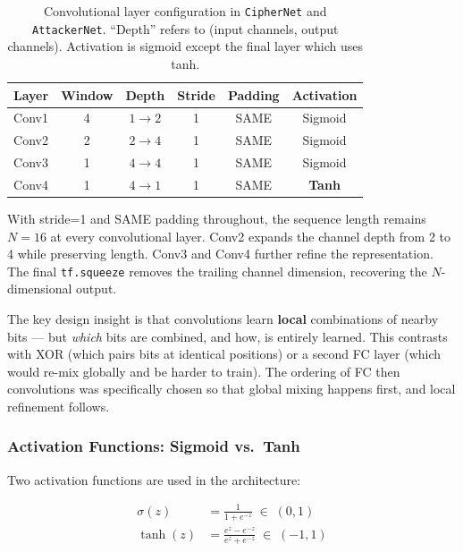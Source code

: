 \documentclass[12pt, a4paper]{article}
\newcommand{\code}[1]{\texttt{\color{CodeRed}#1}}
\begin{document}
\begin{table}[H]
  \centering
  \caption{Convolutional layer configuration in \code{CipherNet} and
           \code{AttackerNet}. ``Depth'' refers to (input channels,
           output channels). Activation is sigmoid except the final
           layer which uses tanh.}
  \label{tab:conv_layers}
  \begin{tabular}{@{} c c c c c c @{}}
    \toprule
    \textbf{Layer} & \textbf{Window} & \textbf{Depth} &
    \textbf{Stride} & \textbf{Padding} & \textbf{Activation} \\
    \midrule
    Conv1 & 4 & $1 \to 2$ & 1 & SAME & Sigmoid \\
    Conv2 & 2 & $2 \to 4$ & 1 & SAME & Sigmoid \\
    Conv3 & 1 & $4 \to 4$ & 1 & SAME & Sigmoid \\
    Conv4 & 1 & $4 \to 1$ & 1 & SAME & \textbf{Tanh} \\
    \bottomrule
  \end{tabular}
\end{table}

\noindent With stride=1 and SAME padding throughout, the sequence length
remains $N=16$ at every convolutional layer. Conv2 expands the channel
depth from 2 to 4 while preserving length. Conv3 and Conv4 further
refine the representation. The final \code{tf.squeeze} removes the
trailing channel dimension, recovering the $N$-dimensional output.

The key design insight is that convolutions learn \textbf{local}
combinations of nearby bits — but \emph{which} bits are combined, and
how, is entirely learned. This contrasts with XOR (which pairs bits at
identical positions) or a second FC layer (which would re-mix globally
and be harder to train). The ordering of FC then convolutions was
specifically chosen so that global mixing happens first, and local
refinement follows.

\subsubsection*{Activation Functions: Sigmoid vs.\ Tanh}

Two activation functions are used in the architecture:

\begin{align}
  \sigma(z) &= \frac{1}{1 + e^{-z}} \;\in\; (0, 1)
  \label{eq:sigmoid} \\[6pt]
  \tanh(z)  &= \frac{e^z - e^{-z}}{e^z + e^{-z}} \;\in\; (-1, 1)
  \label{eq:tanh}
\end{align}
\end{document}

